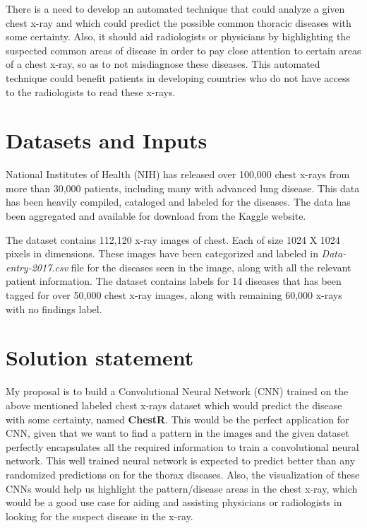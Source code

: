 \documentclass{article}
\begin{document}
    There is a need to develop an automated technique that could analyze a given chest x-ray and which could predict the possible common thoracic diseases with some certainty. Also, it should aid radiologists or physicians by highlighting the suspected common areas of disease in order to pay close attention to certain areas of a chest x-ray, so as to not misdiagnose these diseases. This automated technique could benefit patients in developing countries who do not have access to the radiologists to read these x-rays.

    \section{Datasets and Inputs}

    National Institutes of Health (NIH) has released over 100,000 chest x-rays from more than 30,000 patients, including many with advanced lung disease. This data has been heavily compiled, cataloged and labeled for the diseases.\cite{nih-gov-xray-release} The data has been aggregated and available for download from the Kaggle website.\cite{nih-chest-xray-download} 
    
    The dataset contains 112,120 x-ray images of chest. Each of size 1024 X 1024 pixels in dimensions. These images have been categorized and labeled in \textit{Data-entry-2017.csv} file for the diseases seen in the image, along with all the relevant patient information. The dataset contains labels for 14 diseases that has been tagged for over 50,000 chest x-ray images, along with remaining 60,000 x-rays with no findings label.

    \section{Solution statement}
    
    My proposal is to build a Convolutional Neural Network (CNN) trained on the above mentioned labeled chest x-rays dataset which would predict the disease with some certainty, named \textbf{ChestR}. This would be the perfect application for CNN, given that we want to find a pattern in the images and the given dataset perfectly encapsulates all the required information to train a convolutional neural network. This well trained neural network is expected to predict better than any randomized predictions on for the thorax diseases. Also, the visualization of these CNNs would help us highlight the pattern/disease areas in the chest x-ray, which would be a good use case for aiding and assisting physicians or radiologists in looking for the suspect disease in the x-ray.
\end{document}
